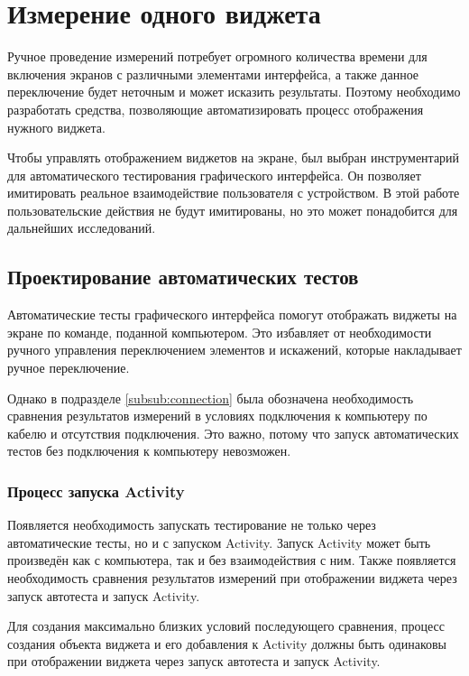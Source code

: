 \documentclass[a4paper,14pt]{extarticle} %
\begin{document}
	\clearpage
	\section{Измерение одного виджета}
	
	Ручное проведение измерений потребует огромного количества времени для включения экранов с различными элементами интерфейса, а также данное переключение будет неточным и может исказить результаты. Поэтому необходимо разработать средства, позволяющие автоматизировать процесс отображения нужного виджета.
	
	Чтобы управлять отображением виджетов на экране, был выбран инструментарий для автоматического тестирования графического интерфейса. Он позволяет имитировать реальное взаимодействие пользователя с устройством. В этой работе пользовательские действия не будут имитированы, но это может понадобится для дальнейших исследований.
	
	\subsection{Проектирование автоматических тестов}
	
	Автоматические тесты графического интерфейса помогут отображать виджеты на экране по команде, поданной компьютером. Это избавляет от необходимости ручного управления переключением элементов и искажений, которые накладывает ручное переключение.
	
	Однако в подразделе \ref{subsub:connection} была обозначена необходимость сравнения результатов измерений в условиях подключения к компьютеру по кабелю и отсутствия подключения. Это важно, потому что запуск автоматических тестов без подключения к компьютеру невозможен. 
	
	\subsubsection{Процесс запуска Activity}\label{subsub:activity_start}
	
	Появляется необходимость запускать тестирование не только через автоматические тесты, но и с запуском Activity. Запуск Activity может быть произведён как с компьютера, так и без взаимодействия с ним. Также появляется необходимость сравнения результатов измерений при отображении виджета через запуск автотеста и запуск Activity.
	
	Для создания максимально близких условий последующего сравнения, процесс создания объекта виджета и его добавления к Activity должны быть одинаковы при отображении виджета через запуск автотеста и запуск Activity.
	
\end{document}
